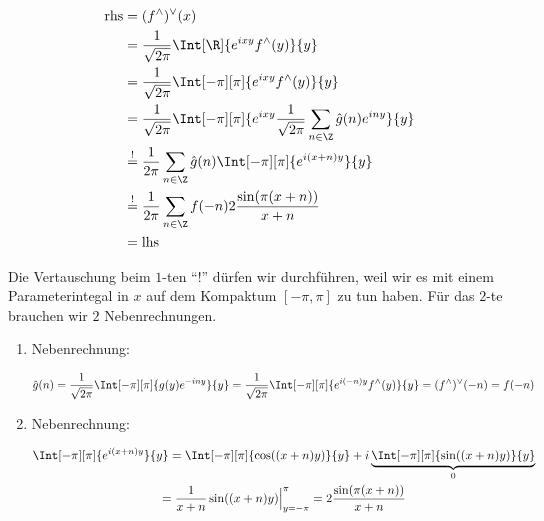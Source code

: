 \begin{solution}
\begin{enumerate}[label = \arabic*.]
    \begin{align*}
        \mathrm{rhs}
        & =
        (f^\wedge)^\vee(x) \\
        & =
        \frac{1}{\sqrt{2 \pi}}
        \Int[\R]
        {
            e^{i x y}
            f^\wedge(y)
        }{y} \\
        & =
        \frac{1}{\sqrt{2 \pi}}
        \Int[-\pi][\pi]
        {
            e^{i x y}
            f^\wedge(y)
        }{y} \\
        & =
        \frac{1}{\sqrt{2 \pi}}
        \Int[-\pi][\pi]
        {
            e^{i x y}
            \frac{1}{\sqrt{2 \pi}}
            \sum_{n \in \Z}
            \hat g(n)
            e^{i n y}
        }{y} \\
        & \stackrel{!}{=}
        \frac{1}{2 \pi}
        \sum_{n \in \Z}
        \hat g(n)
        \Int[-\pi][\pi]
        {
            e^{i (x + n) y}
        }{y} \\
        & \stackrel{!}{=}
        \frac{1}{2 \pi}
        \sum_{n \in \Z}
        f(-n)
        2 \frac{\sin(\pi (x + n))}{x + n} \\
        & =
        \mathrm{lhs}
    \end{align*}

    Die Vertauschung beim $1$-ten \enquote{!} dürfen wir durchführen, weil wir es mit einem Parameterintegal in $x$ auf dem Kompaktum $[-\pi, \pi]$ zu tun haben.
    Für das $2$-te brauchen wir $2$ Nebenrechnungen.

    \begin{enumerate}[label = \arabic*.]

        \item Nebenrechnung:
        
        \begin{align*}
            \hat g(n)
            =
            \frac{1}{\sqrt{2 \pi}}
            \Int[-\pi][\pi]
            {
                g(y)
                e^{-i n y}
            }{y}
            =
            \frac{1}{\sqrt{2 \pi}}
            \Int[-\pi][\pi]
            {
                e^{i (-n) y}
                f^\wedge(y)
            }{y}
            =
            (f^\wedge)^\vee(-n)
            =
            f(-n)
        \end{align*}

        \item Nebenrechnung:

        \begin{multline*}
            \Int[-\pi][\pi]
            {
                e^{i (x + n) y}
            }{y}
            =
            \Int[-\pi][\pi]
            {
                \cos((x + n) y)
            }{y}
            +
            i
            \underbrace
            {
                \Int[-\pi][\pi]
                {
                    \sin((x + n) y)
                }{y}
            }_0 \\
            =
            \frac{1}{x + n}
            \sin((x + n) y) \Big |_{y = -\pi}^\pi
            =
            2 \frac{\sin(\pi (x + n))}{x + n}
        \end{multline*}
    

\end{enumerate}
\end{enumerate}
\end{solution}
